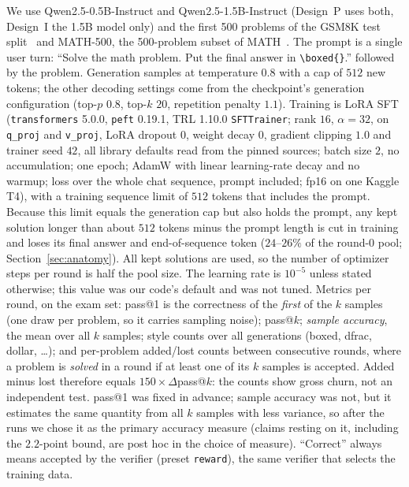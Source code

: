 \documentclass[runningheads]{llncs}
\begin{document}
We use Qwen2.5-0.5B-Instruct and Qwen2.5-1.5B-Instruct (Design~P uses both,
Design~I the 1.5B model only) and the first 500 problems of the GSM8K test
split~\cite{ref_gsm8k} and MATH-500, the 500-problem subset of
MATH~\cite{ref_math}. The prompt is a single user turn: ``Solve the math problem. Put the final answer in
\verb|\boxed{}|.'' followed by the problem. Generation samples at temperature
$0.8$ with a cap of $512$ new tokens; the other decoding settings come from the
checkpoint's generation configuration (top-$p$ $0.8$, top-$k$ $20$, repetition
penalty $1.1$). Training is LoRA SFT (\texttt{transformers} 5.0.0, \texttt{peft}
0.19.1, TRL 1.10.0 \texttt{SFTTrainer}; rank $16$, $\alpha=32$, on
\texttt{q\_proj} and \texttt{v\_proj}, LoRA dropout $0$, weight decay $0$, gradient
clipping $1.0$ and trainer seed $42$, all library defaults read from the pinned sources; batch size $2$, no accumulation; one epoch; AdamW with linear learning-rate
decay and no warmup; loss over the whole chat sequence, prompt included; fp16 on
one Kaggle T4), with a training sequence limit of $512$ tokens that includes the
prompt. Because this limit equals the generation cap but also holds the prompt,
any kept solution longer than about $512$ tokens minus the prompt length is cut
in training and loses its final answer and end-of-sequence token
($24$--$26\%$ of the round-0 pool; Section~\ref{sec:anatomy}). All kept
solutions are used, so the number of optimizer steps per round
is half the pool size. The learning rate is $10^{-5}$ unless stated otherwise;
this value was our code's default and was not tuned. Metrics per round, on the exam set: pass@1 is the
correctness of the \emph{first} of the $k$ samples (one draw per problem, so it
carries sampling noise); pass@$k$; \emph{sample accuracy}, the mean over all $k$
samples; style counts over all generations (boxed, dfrac, dollar, \dots); and
per-problem added/lost counts between consecutive rounds, where a problem is
\emph{solved} in a round if at least one of its $k$ samples is accepted. Added
minus lost therefore equals $150\times\Delta$pass@$k$: the counts show gross churn, not an independent test. pass@1 was
fixed in advance; sample accuracy was not, but it
estimates the same quantity from all $k$ samples with less variance, so after
the runs we chose it as the primary accuracy measure (claims resting on it, including the $2.2$-point bound, are post hoc in the choice of measure). ``Correct'' always means accepted by the verifier (preset
\texttt{reward}), the same verifier that selects the training data.
\end{document}
